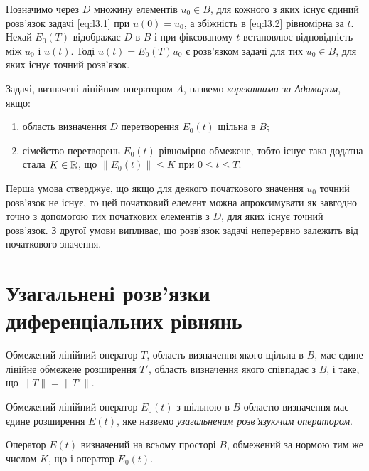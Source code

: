 Позначимо через $D$ множину елементів $u_0 \in B$, для кожного з яких існує єдиний розв'язок задачі \eqref{eq:l3.1} при $u(0) = u_0$, а збіжність в \eqref{eq:l3.2} рівномірна за $t$. Нехай $E_0(T)$ відображає $D$ в $B$ і при фіксованому $t$ встановлює відповідність між $u_0$ і $u(t)$. Тоді $u(t) = E_0(T) u_0$ є розв'язком задачі для тих $u_0 \in B$, для яких існує точний розв'язок.

\begin{definition}
    Задачі, визначені лінійним оператором $A$, назвемо \textit{коректними за Адамаром}, якщо: 
    \begin{enumerate}
        \item область визначення $D$ перетворення $E_0(t)$ щільна в $B$;
        \item сімейство перетворень $E_0(t)$ рівномірно обмежене, тобто існує така додатна стала $K \in \mathbb{R}$, що $\|E_0(t)\| \le K$ при $0 \le t \le T$. 
    \end{enumerate}
\end{definition}

Перша умова стверджує, що якщо для деякого початкового значення $u_0$ точний розв'язок не існує, то цей початковий елемент можна апроксимувати як завгодно точно з допомогою тих початкових елементів з $D$, для яких існує точний розв'язок. З другої умови випливає, що розв'язок задачі неперервно залежить від початкового значення. 

\section{Узагальнені розв'язки диференціальних рівнянь}

\begin{theorem}%
    Обмежений лінійний оператор $T$, область визначення якого щільна в $B$, має єдине лінійне обмежене розширення $T'$, область визначення якого співпадає з $B$, і таке, що $\|T\| = \|T'\|$.
\end{theorem}

\begin{definition}
    Обмежений лінійний оператор $E_0(t)$ з щільною в $B$ областю визначення має єдине розширення $E(t)$, яке назвемо \textit{узагальненим розв'язуючим оператором}.
\end{definition}

Оператор $E(t)$ визначений на всьому просторі $B$, обмежений за нормою тим же числом $K$, що і оператор $E_0(t)$. 

